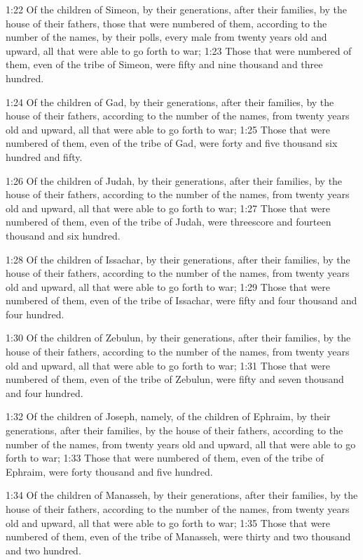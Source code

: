 1:22 Of the children of Simeon, by their generations, after their
families, by the house of their fathers, those that were numbered of
them, according to the number of the names, by their polls, every male
from twenty years old and upward, all that were able to go forth to
war; 1:23 Those that were numbered of them, even of the tribe of
Simeon, were fifty and nine thousand and three hundred.

1:24 Of the children of Gad, by their generations, after their
families, by the house of their fathers, according to the number of
the names, from twenty years old and upward, all that were able to go
forth to war; 1:25 Those that were numbered of them, even of the tribe
of Gad, were forty and five thousand six hundred and fifty.

1:26 Of the children of Judah, by their generations, after their
families, by the house of their fathers, according to the number of
the names, from twenty years old and upward, all that were able to go
forth to war; 1:27 Those that were numbered of them, even of the tribe
of Judah, were threescore and fourteen thousand and six hundred.

1:28 Of the children of Issachar, by their generations, after their
families, by the house of their fathers, according to the number of
the names, from twenty years old and upward, all that were able to go
forth to war; 1:29 Those that were numbered of them, even of the tribe
of Issachar, were fifty and four thousand and four hundred.

1:30 Of the children of Zebulun, by their generations, after their
families, by the house of their fathers, according to the number of
the names, from twenty years old and upward, all that were able to go
forth to war; 1:31 Those that were numbered of them, even of the tribe
of Zebulun, were fifty and seven thousand and four hundred.

1:32 Of the children of Joseph, namely, of the children of Ephraim, by
their generations, after their families, by the house of their
fathers, according to the number of the names, from twenty years old
and upward, all that were able to go forth to war; 1:33 Those that
were numbered of them, even of the tribe of Ephraim, were forty
thousand and five hundred.

1:34 Of the children of Manasseh, by their generations, after their
families, by the house of their fathers, according to the number of
the names, from twenty years old and upward, all that were able to go
forth to war; 1:35 Those that were numbered of them, even of the tribe
of Manasseh, were thirty and two thousand and two hundred.

